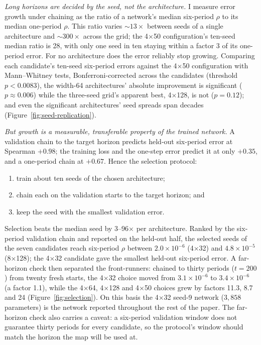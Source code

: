 \documentclass[11pt,a4paper]{article}
\begin{document}
\emph{Long horizons are decided by the seed, not the architecture.} I
measure error growth under chaining as the ratio of a network's median
six-period $\rho$ to its median one-period $\rho$. This ratio varies
${\sim}13\times$ between seeds of a single architecture and
${\sim}300\times$ across the grid; the 4$\times$50 configuration's
ten-seed median ratio is 28, with only one seed in ten staying within a
factor 3 of its one-period error. For no architecture does the error
reliably stop growing. Comparing each candidate's ten-seed six-period
errors against the 4$\times$50 configuration with Mann--Whitney tests,
Bonferroni-corrected across the candidates (threshold $p < 0.0083$), the
width-64 architectures' absolute improvement is significant
($p \approx 0.006$) while the three-seed grid's apparent best,
4$\times$128, is not ($p = 0.12$); and even the significant
architectures' seed spreads span decades
(Figure~\ref{fig:seed-replication}).

\emph{But growth is a measurable, transferable property of the trained
network.} A validation chain to the target horizon predicts held-out
six-period error at Spearman $+0.98$; the training loss and the one-step
error predict it at only $+0.35$, and a one-period chain at $+0.67$.
Hence the selection protocol:
\begin{enumerate}
  \item train about ten seeds of the chosen architecture;
  \item chain each on the validation starts to the target horizon; and
  \item keep the seed with the smallest validation error.
\end{enumerate}
Selection beats the median seed by 3--96$\times$ per architecture.
Ranked by the six-period validation chain and reported on the held-out
half, the selected seeds of the seven candidates reach six-period $\rho$
between $2.0\times10^{-6}$ (4$\times$32) and $4.8\times10^{-5}$
(8$\times$128); the 4$\times$32 candidate gave the smallest held-out
six-period error. A far-horizon check then separated the front-runners:
chained to thirty periods ($t = 200$) from twenty fresh starts, the
4$\times$32 choice moved from $3.1\times10^{-6}$ to $3.4\times10^{-6}$
(a factor 1.1), while the 4$\times$64, 4$\times$128 and 4$\times$50
choices grew by factors 11.3, 8.7 and 24
(Figure~\ref{fig:selection}). On this basis the 4$\times$32 seed-9
network ($3{,}858$ parameters) is the network reported throughout the
rest of the paper. The far-horizon check also carries a caveat: a
six-period validation window does not guarantee thirty periods for every
candidate, so the protocol's window should match the horizon the map
will be used at.
\end{document}
